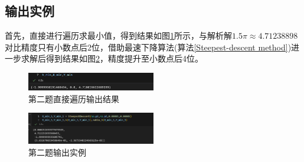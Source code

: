 \documentclass[11pt]{article}
\begin{document}
\subsection{输出实例}
首先，直接进行遍历求最小值，得到结果如图\ref{fig:第二题直接遍历输出结果}所示，与解析解$1.5\pi \approx 4.71238898$对比精度只有小数点后2位，借助最速下降算法(算法\ref{Steepest-descent method})进一步求解后得到结果如图\ref{fig:第二题输出实例}，精度提升至小数点后4位。
\begin{figure}
    \centering
    \includegraphics[width=0.5\textwidth]{第二题直接遍历输出结果.png}
    \caption{第二题直接遍历输出结果}
    \label{fig:第二题直接遍历输出结果}
\end{figure}

\begin{figure}
    \centering
    \includegraphics[width=0.5\textwidth]{第二题输出实例.png}
    \caption{第二题输出实例}
    \label{fig:第二题输出实例}
\end{figure}
\end{document}
